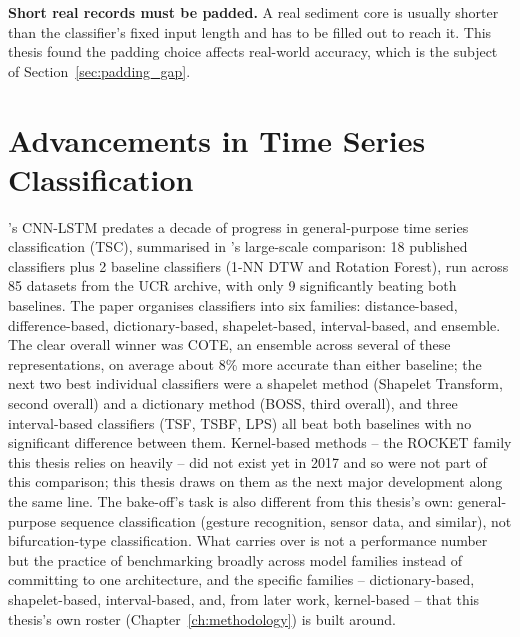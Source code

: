 \textbf{Short real records must be padded.} A real sediment core is usually shorter than the classifier's fixed input length and has to be filled out to reach it. This thesis found the padding choice affects real-world accuracy, which is the subject of Section~\ref{sec:padding_gap}.

\section{Advancements in Time Series Classification}
\citet{bury2021}'s CNN-LSTM predates a decade of progress in general-purpose time series classification (TSC), summarised in \citet{bagnall2017bakeoff}'s large-scale comparison: 18 published classifiers plus 2 baseline classifiers (1-NN DTW and Rotation Forest), run across 85 datasets from the UCR archive, with only 9 significantly beating both baselines. The paper organises classifiers into six families: distance-based, difference-based, dictionary-based, shapelet-based, interval-based, and ensemble. The clear overall winner was COTE, an ensemble across several of these representations, on average about 8\% more accurate than either baseline; the next two best individual classifiers were a shapelet method (Shapelet Transform, second overall) and a dictionary method (BOSS, third overall), and three interval-based classifiers (TSF, TSBF, LPS) all beat both baselines with no significant difference between them. Kernel-based methods -- the ROCKET family this thesis relies on heavily -- did not exist yet in 2017 and so were not part of this comparison; this thesis draws on them as the next major development along the same line. The bake-off's task is also different from this thesis's own: general-purpose sequence classification (gesture recognition, sensor data, and similar), not bifurcation-type classification. What carries over is not a performance number but the practice of benchmarking broadly across model families instead of committing to one architecture, and the specific families -- dictionary-based, shapelet-based, interval-based, and, from later work, kernel-based -- that this thesis's own roster (Chapter~\ref{ch:methodology}) is built around.

